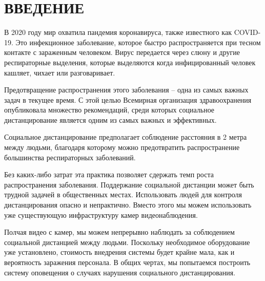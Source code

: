 \chapter*{ВВЕДЕНИЕ}

В 2020 году мир охватила пандемия коронавируса, также известного как COVID-19. Это инфекционное заболевание, которое быстро распространяется при тесном контакте с зараженным человеком. Вирус передается через слюну и другие респираторные выделения, которые выделяются когда инфицированный человек кашляет, чихает или разговаривает.

Предотвращение распространения этого заболевания -- одна из самых важных задач в текущее время. С этой целью Всемирная организация здравоохранения опубликовала множество рекомендаций, среди которых социальное дистанцирование является одним из самых важных и эффективных.

Социальное дистанцирование предполагает соблюдение расстояния в 2 метра между людьми, благодаря которому можно предотвратить распространение большинства респираторных заболеваний.

Без каких-либо затрат эта практика позволяет сдержать темп роста распространения заболевания. Поддержание социальной дистанции может быть трудной задачей в общественных местах. Использовать людей для контроля дистанцирования опасно и непрактично. Вместо этого мы можем использовать уже существующую инфраструктуру камер видеонаблюдения. 

Полчая видео с камер, мы можем непрерывно наблюдать за соблюдением социальной дистанцией между людьми. Поскольку необходимое оборудование уже установлено, стоимость внедрения системы будет крайне мала, как и вероятность заражения персонала. В общих чертах, мы попытаемся построить систему оповещения о случаях нарушения социального дистанцирования.

\newpage